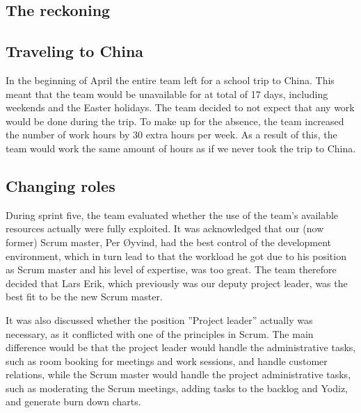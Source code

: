 \subsection{The reckoning}


\subsection{Traveling to China}
In the beginning of April the entire team left for a school trip to China. This meant that the team would be unavailable for at total of 17 days, including weekends and the Easter holidays. The team decided to not expect that any work would be done during the trip. To make up for the absence, the team increased the number of work hours by 30 extra hours per week. As a result of this, the team would work the same amount of hours as if we never took the trip to China.

\subsection{Changing roles}
\label{sec:unbalancedWorkload}
During sprint five, the team evaluated whether the use of the team's available resources actually were fully exploited. It was acknowledged that our (now former) Scrum master, Per Øyvind, had the best control of the development environment, which in turn lead to that the workload he got due to his position as Scrum master and his level of expertise, was too great. The team therefore decided that Lars Erik, which previously was our deputy project leader, was the best fit to be the new Scrum master.

It was also discussed whether the position ''Project leader'' actually was necessary, as it conflicted with one of the principles in Scrum.  The main difference would be that the project leader would handle the administrative tasks, such as room booking for meetings and work sessions, and handle customer relations, while the Scrum master would handle the project administrative tasks, such as moderating the Scrum meetings, adding tasks to the backlog and Yodiz, and generate burn down charts.